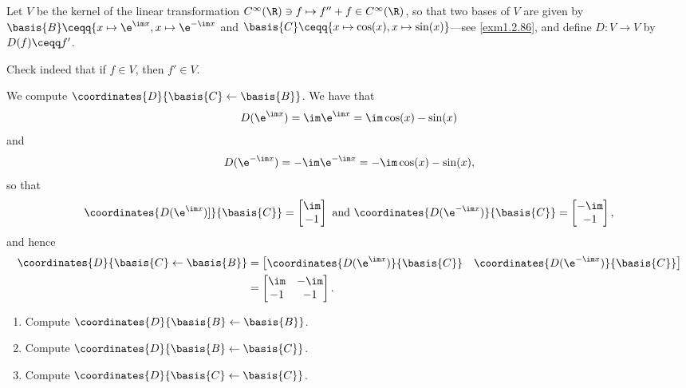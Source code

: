 \begin{exm}{}{}
	Let $V$ be the kernel of the linear transformation $C^{\infty}(\R )\ni f\mapsto f''+f\in C^{\infty}(\R )$, so that two bases of $V$ are given by $\basis{B}\ceqq \{ x\mapsto \e ^{\im x},x\mapsto \e ^{-\im x}$ and $\basis{C}\ceqq \{ x\mapsto \cos (x),x\mapsto \sin (x)\}$---see \cref{exm1.2.86}, and define $D\colon V\rightarrow V$ by $D(f)\ceqq f'$.
	\begin{exr}[breakable=false]{}{}
		Check indeed that if $f\in V$, then $f'\in V$.
	\end{exr}
	
	We compute $\coordinates{D}{\basis{C}\leftarrow \basis{B}}$.  We have that
	\begin{equation}
		D(\e ^{\im x})=\im \e ^{\im x}=\im \cos (x)-\sin (x)
	\end{equation}
	and
	\begin{equation}
		D(\e ^{-\im x})=-\im \e ^{-\im x}=-\im \cos (x)-\sin (x),
	\end{equation}
	so that
	\begin{equation}
		\coordinates{D(\e ^{\im x})]}{\basis{C}}=\begin{bmatrix}\im \\ -1\end{bmatrix}\text{ and }\coordinates{D(\e ^{-\im x})}{\basis{C}}=\begin{bmatrix}-\im \\ -1\end{bmatrix},
	\end{equation}
	and hence
	\begin{equation}
		\begin{split}
			\coordinates{D}{\basis{C}\leftarrow \basis{B}} & =\begin{bmatrix}\coordinates{D(\e ^{\im x})}{\basis{C}} & \coordinates{D(\e ^{-\im x})}{\basis{C}}\end{bmatrix} \\
			& =\begin{bmatrix}\im & -\im \\ -1 & -1\end{bmatrix}.
		\end{split}
	\end{equation}
	
	\begin{exr}[breakable=false]{}{}
		\begin{enumerate}
			\item Compute $\coordinates{D}{\basis{B}\leftarrow \basis{B}}$.
			\item Compute $\coordinates{D}{\basis{B}\leftarrow \basis{C}}$.
			\item Compute $\coordinates{D}{\basis{C}\leftarrow \basis{C}}$.
		\end{enumerate}
	\end{exr}
\end{exm}
